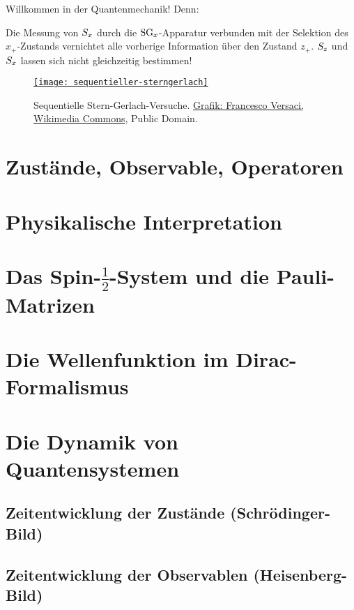 Willkommen in der Quantenmechanik! Denn:
\begin{erg}
 Die Messung von $S_x$ durch die $\text{SG}_x$-Apparatur verbunden mit der Selektion des $x_+$-Zustands vernichtet alle vorherige Information \"uber den Zustand $z_+$. $S_z$ und $S_x$ lassen sich nicht gleichzeitig bestimmen!
\end{erg}

\begin{figure}
 \href{http://commons.wikimedia.org/wiki/File:Sg-seq.svg}{\texttt{[image: sequentieller-sterngerlach]}}
\caption{\label{fig:seqSQ}Sequentielle Stern-Gerlach-Versuche. \href{http://commons.wikimedia.org/wiki/File:Sg-seq.svg}{Grafik: Francesco Versaci, Wikimedia Commons}, Public Domain.}
\end{figure}


\section{Zust\"ande, Observable, Operatoren}

\section{Physikalische Interpretation}

\section{Das Spin-$\frac{1}{2}$-System und die Pauli-Matrizen}

\section{Die Wellenfunktion im Dirac-Formalismus}

\section{Die Dynamik von Quantensystemen}
\subsection{Zeitentwicklung der Zust\"ande (Schr\"odinger-Bild)}

\subsection{Zeitentwicklung der Observablen (Heisenberg-Bild)}